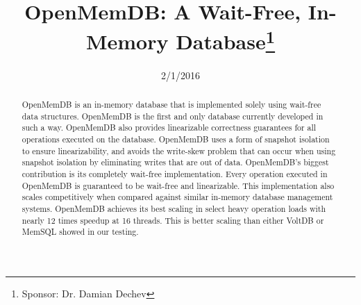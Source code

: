 \documentclass[conference, compsoc]{IEEEtran}
\begin{document}
\title{OpenMemDB: A Wait-Free, In-Memory Database\thanks{Sponsor: Dr. Damian Dechev}}
\author{
 \and 
{} \and 
{} \and 
{}
}

\date{2/1/2016}

\maketitle
\newpage

\begin{abstract}
OpenMemDB is an in-memory database that is implemented solely using wait-free
data structures. OpenMemDB is the first and only database currently developed in such a
way. OpenMemDB also provides linearizable correctness guarantees for all operations
executed on the database. OpenMemDB uses a form of snapshot isolation to ensure 
linearizability, and avoids the write-skew problem that can occur when using
snapshot isolation by eliminating writes that are out of data. 
OpenMemDB's biggest contribution is its completely wait-free 
implementation. Every operation executed in OpenMemDB is guaranteed to be wait-free 
and linearizable. This implementation also scales competitively when compared 
against similar in-memory database management systems.
OpenMemDB achieves its best scaling in select heavy operation loads with nearly 
12 times speedup at 16 threads. This is better scaling than either VoltDB or MemSQL showed
in our testing. 
\end{abstract}
\end{document}
